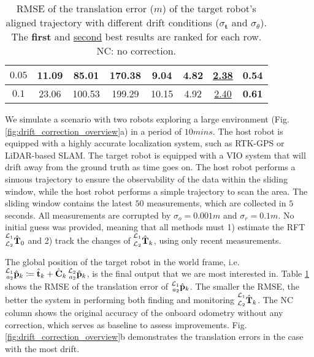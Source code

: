 \documentclass[journal]{IEEEtran}
\begin{document}
\begin{table}[t]
\begin{adjustbox}{width=\columnwidth}
\begin{tabular}[t]{
    @{\hskip3pt}c@{\hskip3pt}|
    @{\hskip3pt}c@{\hskip3pt}|
    @{\hskip2pt}c@{\hskip2pt}|
    @{\hskip2pt}c@{\hskip2pt}|
    c|c|c|c}
    \hline
    $0.05$
    & 11.09
    & 85.01 & 170.38 & 9.04 & 4.82
    & \underline{2.38} & \textbf{0.54} \\ %
    \hline
    $0.1$
    & 23.06
    & 100.53 & 199.29 & 10.15 & 4.92
    & \underline{2.40} & \textbf{0.61} \\%
    \bottomrule
    \end{tabular}
\end{adjustbox}
\caption{RMSE of the translation error ($\si{m}$) of the target robot's aligned trajectory with different drift conditions ($\sigma_{\mathbf{t}}$ and $\sigma_{\theta}$). The \textbf{first} and \underline{second} best results are ranked for each row. NC: no correction.}
\label{table:results_drift_correction}
\end{table}

We simulate a scenario with two robots exploring a large environment (Fig. \ref{fig:drift_correction_overview}a) in a period of $10\si{mins}$. The host robot is equipped with a highly accurate localization system, such as RTK-GPS or LiDAR-based SLAM. The target robot is equipped with a VIO system that will drift away from the ground truth as time goes on. The host robot performs a sinuous trajectory to ensure the observability of the data within the sliding window, while the host robot performs a simple trajectory to scan the area. The sliding window contains the latest $50$ measurements, which are collected in $5$ seconds. 
All measurements are corrupted by $\sigma_o = 0.001\si{m}$ and $\sigma_r = 0.1\si{m}$.
No initial guess was provided, meaning that all methods must 1) estimate the RFT $\prescript{\mathcal{L}_1}{\mathcal{L}_2}{\hat{\mathbf{T}}}_0$ and 2) track the changes of $\prescript{\mathcal{L}_1}{\mathcal{L}_2}{\hat{\mathbf{T}}}_k$, using only recent measurements.

The global position of the target robot in the world frame, i.e. $\prescript{\mathcal{L}_1}{a_2}{\hat{\mathbf{p}}}_k \coloneqq \hat{\mathbf{t}}_k + \hat{\mathbf{C}}_k \prescript{\mathcal{L}_2}{a_2}{\hat{\mathbf{p}}}_k$, is the final output that we are most interested in. Table \ref{table:results_drift_correction} shows the RMSE of the translation error of $\prescript{\mathcal{L}_1}{a_2}{\hat{\mathbf{p}}}_k$. The smaller the RMSE, the better the system in performing both finding and monitoring $\prescript{\mathcal{L}_1}{\mathcal{L}_2}{\hat{\mathbf{T}}}_k$. The NC column shows the original accuracy of the onboard odometry without any correction, which serves as baseline to assess improvements.  Fig. \ref{fig:drift_correction_overview}b demonstrates the translation errors in the case with the most drift.
\end{document}
